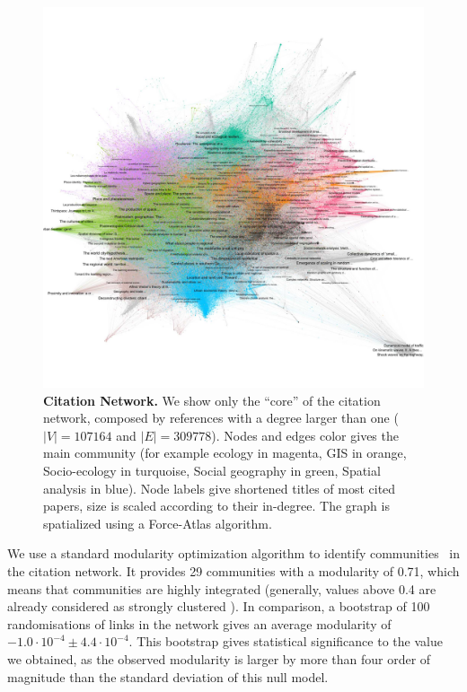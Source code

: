 \begin{figure}
\hspace{-2cm}
\includegraphics[width=1.6\textwidth]{figures/Fig5.jpg}
\caption{\textbf{Citation Network.}  We show only the ``core'' of the citation network, composed by references with a degree larger than one ($\left|V\right| = 107164$ and $\left|E\right| = 309778$). Nodes and edges color gives the main community (for example ecology in magenta, GIS in orange, Socio-ecology in turquoise, Social geography in green, Spatial analysis in blue). Node labels give shortened titles of most cited papers, size is scaled according to their in-degree. The graph is spatialized using a Force-Atlas algorithm.}
\label{fig:citnw}
\end{figure}



We use a standard modularity optimization algorithm to identify communities~\citep{blondel2008fast} in the citation network.  It provides 29 communities with a modularity of 0.71, which means that communities are highly integrated (generally, values above 0.4 are already considered as strongly clustered \citep{newman2006modularity}). In comparison, a bootstrap of 100 randomisations of links in the network gives an average modularity of $-1.0\cdot 10^{-4} \pm 4.4\cdot 10^{-4}$. This bootstrap gives statistical significance to the value we obtained, as the observed modularity is larger by more than four order of magnitude than the standard deviation of this null model.


